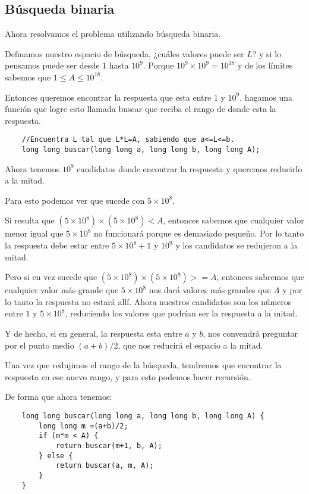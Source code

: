 \subsection*{Búsqueda binaria}
Ahora resolvamos el problema utilizando búsqueda binaria.

Definamos nuestro espacio de búsqueda, ¿cuáles valores puede ser \(L\)? y si lo pensamos puede ser desde \(1\) hasta \(10^9\). Porque \(10^9\times 10^9=10^{18}\) y de los límites sabemos que \(1\leq A\leq 10^{18}\).

Entonces queremos encontrar la respuesta que esta entre \(1\) y \(10^9\), hagamos una función que logre esto llamada buscar que reciba el rango de donde esta la respuesta.

\begin{lstlisting}
	//Encuentra L tal que L*L=A, sabiendo que a<=L<=b.
	long long buscar(long long a, long long b, long long A);
\end{lstlisting}

Ahora tenemos \(10^9\) candidatos donde encontrar la respuesta y queremos reducirlo a la mitad. 

Para esto podemos ver que sucede con \(5\times10^8\). 

Si resulta que \((5\times10^8)\times(5\times10^8) <A\), entonces sabemos que cualquier valor menor igual que \(5 \times 10^8\) no funcionará porque es demasiado pequeño. Por lo tanto la respuesta debe estar entre \(5\times 10^8 +1\) y \(10^9\) y los candidatos se redujeron a la mitad.

Pero si en vez sucede que \((5\times10^8)\times(5\times10^8) >=A\), entonces sabremos que cualquier valor más grande que \(5\times 10^8\) nos dará valores más grandes que \(A\) y por lo tanto la respuesta no estará allí. Ahora nuestros candidatos son los números entre \(1\) y \(5\times 10^8\), reduciendo los valores que podrían ser la respuesta a la mitad.

Y de hecho, si en general, la respuesta esta entre \(a\) y \(b\), nos convendrá preguntar por el punto medio \((a+b)/2\), que nos reducirá el espacio a la mitad.

Una vez que redujimos el rango de la búsqueda, tendremos que encontrar la respuesta en ese nuevo rango, y para esto podemos hacer recursión.

De forma que ahora tenemos:

\begin{minipage}{\linewidth}	
\begin{lstlisting}
	long long buscar(long long a, long long b, long long A) {
		long long m =(a+b)/2;
		if (m*m < A) {
			return buscar(m+1, b, A);
		} else {
			return buscar(a, m, A);
		}
	} 
\end{lstlisting}

\end{minipage}



